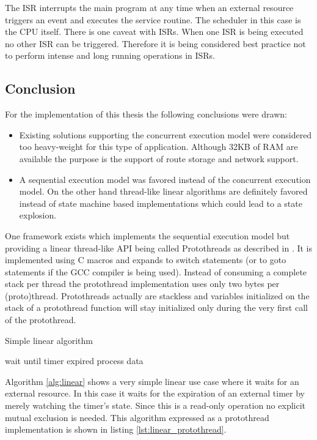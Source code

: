 The ISR interrupts the main program at any time when an external resource triggers an event and executes the service routine. The scheduler in this case is the CPU itself. There is one caveat with ISRs. When one ISR is being executed no other ISR can be triggered. Therefore it is being considered best practice not to perform intense and long running operations in ISRs.

\subsection{Conclusion}%
For the implementation of this thesis the following conclusions were drawn:

\begin{itemize}
    \item Existing solutions supporting the concurrent execution model were considered too heavy-weight for this type of application. Although 32KB of RAM are available the purpose is the support of route storage and network support.
    \item A sequential execution model was favored instead of the concurrent execution model. On the other hand thread-like linear algorithms are definitely favored instead of state machine based implementations which could lead to a state explosion.
\end{itemize}

One framework exists which implements the sequential execution model but providing a linear thread-like API being called Protothreads as described in \cite{dunkels}. It is implemented using C macros and expands to switch statements (or to goto statements if the GCC compiler is being used). Instead of consuming a complete stack per thread the protothread implementation uses only two bytes per (proto)thread. Protothreads actually are stackless and variables initialized on the stack of a protothread function will stay initialized only during the very first call of the protothread.

\begin{algorithm}[H]
\caption{Simple linear algorithm}
\label{alg:linear}
\begin{algorithmic}
    \STATE wait until timer expired
    \STATE process data
\ENDWHILE
\end{algorithmic}
\end{algorithm}

Algorithm \ref{alg:linear} shows a very simple linear use case where it waits for an external resource. In this case it waits for the expiration of an external timer by merely watching the timer's state. Since this is a read-only operation no explicit mutual exclusion is needed. This algorithm expressed as a protothread implementation is shown in listing \ref{lst:linear_protothread}.

